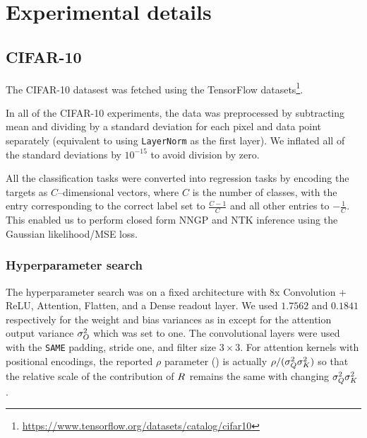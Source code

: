 \onecolumn

\appendix


\section{Experimental details}\label{sect:experimental_details}


\subsection{CIFAR-10}

The CIFAR-10 datasest \citep{cifar10} was fetched using the TensorFlow datasets\footnote{\url{https://www.tensorflow.org/datasets/catalog/cifar10}}.

In all of the CIFAR-10 experiments, the data was preprocessed by subtracting mean and dividing by a standard deviation for each pixel and data point separately (equivalent to using \texttt{LayerNorm} as the first layer). 
We inflated all of the standard deviations by $10^{-15}$ to avoid division by zero. 

All the classification tasks were converted into regression tasks by encoding the targets as $C$--dimensional vectors, where $C$ is the number of classes, with the entry corresponding to the correct label set to $\frac{C - 1}{C}$ and all other entries to $-\frac{1}{C}$.
This enabled us to perform closed form NNGP and NTK inference using the Gaussian likelihood/MSE loss.




\subsubsection{Hyperparameter search}\label{sect:hyperparam_appendix}

The hyperparameter search was on a fixed architecture with 8x Convolution + ReLU, Attention, Flatten, and a Dense readout layer.
We used $1.7562$ and $0.1841$ respectively for the weight and bias variances as in \citep[appendix G.1]{novak2019bayesian} except for the attention output variance $\sigma_{O}^2$ which was set to one.
The convolutional layers were used with the \texttt{SAME} padding, stride one, and filter size $3 \times 3$.
For attention kernels with positional encodings, the reported $\rho$ parameter () is actually $\rho / (\sigma_{Q}^2 \sigma_{K}^2)$ so that the relative scale of the contribution of $R_{}^{}$ remains the same with changing $\sigma_{Q}^2 \sigma_{K}^2$.


